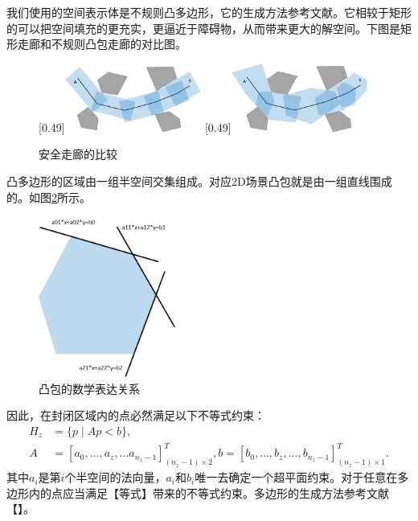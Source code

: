 \documentclass[master,academic]{ysuthesis} %
\begin{document}
		我们使用的空间表示体是不规则凸多边形，它的生成方法参考文献\cite{SikangLiu:2017}。它相较于矩形的可以把空间填充的更充实，更逼近于障碍物，从而带来更大的解空间。下图是矩形走廊和不规则凸包走廊的对比图。
		\begin{figure}[!ht]
			\centering
			[0.49\textwidth]{\includegraphics[width=0.4\textwidth]{安全走廊比较矩形1.png}}
			[0.49\textwidth]{\includegraphics[width=0.4\textwidth]{安全走廊比较多边形2.png}}
			\caption{安全走廊的比较}
			\label{安全走廊比较}
		\end{figure}
		
		凸多边形的区域由一组半空间交集组成。对应2D场景凸包就是由一组直线围成的。如图\ref{fig:凸包矩阵}所示。
		\begin{figure}[!ht]
			\centering
			\includegraphics[width=0.4\textwidth]{凸包矩阵.png}
			\caption{凸包的数学表达关系}
			\label{fig:凸包矩阵}
		\end{figure}
		因此，在封闭区域内的点必然满足以下不等式约束：
		\begin{equation}
			\begin{aligned}
				H_z&=\{p\mid Ap<b\},\\
				A&=\left[ a_0,...,a_z,...a_{n_z-1} \right]^T_{(n_z-1)\times 2},b=\left[ b_0,...,b_z,...,b_{n_z-1} \right]^T_{(n_z-1)\times 1}.
			\end{aligned}
		\end{equation}
		其中$a_i$是第$i$个半空间的法向量，$a_i$和$b_i$唯一去确定一个超平面约束。对于任意在多边形内的点应当满足【等式】带来的不等式约束。多边形的生成方法参考文献【】。
	
\end{document}
